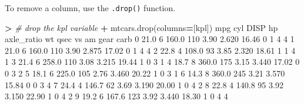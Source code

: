 \documentclass[
]{book}
\newenvironment{Shaded}{\begin{snugshade}}{\end{snugshade}}
\newcommand{\CommentTok}[1]{\textcolor[rgb]{0.56,0.35,0.01}{\textit{#1}}}
\newcommand{\DecValTok}[1]{\textcolor[rgb]{0.00,0.00,0.81}{#1}}
\newcommand{\FloatTok}[1]{\textcolor[rgb]{0.00,0.00,0.81}{#1}}
\newcommand{\NormalTok}[1]{#1}
\newcommand{\OperatorTok}[1]{\textcolor[rgb]{0.81,0.36,0.00}{\textbf{#1}}}
\newcommand{\StringTok}[1]{\textcolor[rgb]{0.31,0.60,0.02}{#1}}
\begin{document}
To remove a column, use the \texttt{.drop()} function.

\begin{Shaded}
\begin{Highlighting}[]
\OperatorTok{\textgreater{}} \CommentTok{\# drop the kpl variable}
\OperatorTok{+}\NormalTok{ mtcars.drop(columns}\OperatorTok{=}\NormalTok{[}\StringTok{\textquotesingle{}kpl\textquotesingle{}}\NormalTok{])}
\NormalTok{     mpg  cyl   DISP   hp  axle\_ratio     wt   qsec  vs  am  gear  carb}
\DecValTok{0}   \FloatTok{21.0}    \DecValTok{6}  \FloatTok{160.0}  \DecValTok{110}        \FloatTok{3.90}  \FloatTok{2.620}  \FloatTok{16.46}   \DecValTok{0}   \DecValTok{1}     \DecValTok{4}     \DecValTok{4}
\DecValTok{1}   \FloatTok{21.0}    \DecValTok{6}  \FloatTok{160.0}  \DecValTok{110}        \FloatTok{3.90}  \FloatTok{2.875}  \FloatTok{17.02}   \DecValTok{0}   \DecValTok{1}     \DecValTok{4}     \DecValTok{4}
\DecValTok{2}   \FloatTok{22.8}    \DecValTok{4}  \FloatTok{108.0}   \DecValTok{93}        \FloatTok{3.85}  \FloatTok{2.320}  \FloatTok{18.61}   \DecValTok{1}   \DecValTok{1}     \DecValTok{4}     \DecValTok{1}
\DecValTok{3}   \FloatTok{21.4}    \DecValTok{6}  \FloatTok{258.0}  \DecValTok{110}        \FloatTok{3.08}  \FloatTok{3.215}  \FloatTok{19.44}   \DecValTok{1}   \DecValTok{0}     \DecValTok{3}     \DecValTok{1}
\DecValTok{4}   \FloatTok{18.7}    \DecValTok{8}  \FloatTok{360.0}  \DecValTok{175}        \FloatTok{3.15}  \FloatTok{3.440}  \FloatTok{17.02}   \DecValTok{0}   \DecValTok{0}     \DecValTok{3}     \DecValTok{2}
\DecValTok{5}   \FloatTok{18.1}    \DecValTok{6}  \FloatTok{225.0}  \DecValTok{105}        \FloatTok{2.76}  \FloatTok{3.460}  \FloatTok{20.22}   \DecValTok{1}   \DecValTok{0}     \DecValTok{3}     \DecValTok{1}
\DecValTok{6}   \FloatTok{14.3}    \DecValTok{8}  \FloatTok{360.0}  \DecValTok{245}        \FloatTok{3.21}  \FloatTok{3.570}  \FloatTok{15.84}   \DecValTok{0}   \DecValTok{0}     \DecValTok{3}     \DecValTok{4}
\DecValTok{7}   \FloatTok{24.4}    \DecValTok{4}  \FloatTok{146.7}   \DecValTok{62}        \FloatTok{3.69}  \FloatTok{3.190}  \FloatTok{20.00}   \DecValTok{1}   \DecValTok{0}     \DecValTok{4}     \DecValTok{2}
\DecValTok{8}   \FloatTok{22.8}    \DecValTok{4}  \FloatTok{140.8}   \DecValTok{95}        \FloatTok{3.92}  \FloatTok{3.150}  \FloatTok{22.90}   \DecValTok{1}   \DecValTok{0}     \DecValTok{4}     \DecValTok{2}
\DecValTok{9}   \FloatTok{19.2}    \DecValTok{6}  \FloatTok{167.6}  \DecValTok{123}        \FloatTok{3.92}  \FloatTok{3.440}  \FloatTok{18.30}   \DecValTok{1}   \DecValTok{0}     \DecValTok{4}     \DecValTok{4}

\end{Highlighting}
\end{Shaded}
\end{document}
